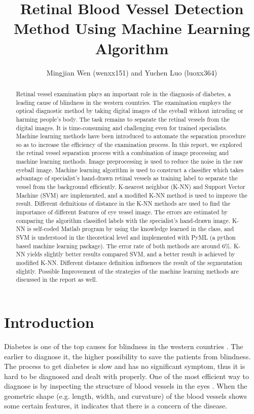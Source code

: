 \documentclass[12pt, notitlepage]{article}
\title{\textbf{Retinal Blood Vessel Detection Method Using Machine Learning Algorithm}}
\author{Mingjian Wen (wenxx151) and Yuchen Luo (luoxx364)}
\date{}
\begin{document}
					
\maketitle
\thispagestyle{empty}
\setcounter{page}{1}

\begin{abstract}
\noindent Retinal vessel examination plays an important role in the diagnosis of diabetes, a leading cause of blindness in the western countries.  The examination employs the optical diagnostic method by taking digital images of the eyeball without intruding or harming people’s body.  The task remains to separate the retinal vessels from the digital images.  It is time-consuming and challenging even for trained specialists.  Machine learning methods have been introduced to automate the separation procedure so as to increase the efficiency of the examination process.  In this report, we explored the retinal vessel separation process with a combination of image processing and machine learning methods. Image preprocessing is used to reduce the noise in the raw eyeball image.  Machine learning algorithm is used to construct a classifier which takes advantage of specialist's hand-drawn retinal vessels as training label to separate the vessel from the background efficiently. K-nearest neighbor (K-NN) and Support Vector Machine (SVM) are implemented, and a modified K-NN method is used to improve the result.  Different definitions of distance in the K-NN methods are used to find the importance of different features of eye vessel image.  The errors are estimated by comparing the algorithm classified labels with the specialist's hand-drawn image. K-NN is self-coded Matlab program by using the knowledge learned in the class, and SVM is understood in the theoretical level and implemented with PyML (a python based machine learning package). The error rate of both methods are around 6\%. K-NN yields slightly better results compared SVM, and a better result is achieved by modified K-NN.  Different distance definition influences the result of the segmentation slightly. Possible Improvement of the strategies of the machine learning methods are discussed in the report as well.
\end{abstract}


\newpage
\section{Introduction}

Diabetes is one of the top causes for blindness in the western countries \cite{centers2011national}. The earlier to diagnose it, the higher possibility to save the patients from blindness.  The process to get diabetes is slow and has no significant symptom, thus it is hard to be diagnosed and dealt with properly.  One of the most efficient way to diagnose is by inspecting the structure of blood vessels in the eyes \cite{hoover2003locating}.  When the geometric shape (e.g. length, width, and curvature) of the blood vessels shows some certain features, it indicates that there is a concern of the disease.  
\end{document}
